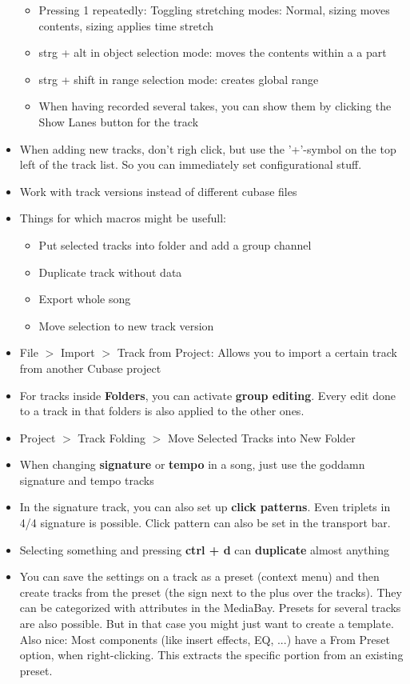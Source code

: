 \documentclass[10pt]{article}
\begin{document}
\begin{itemize}
\begin{itemize}
		\item Pressing 1 repeatedly: Toggling stretching modes: Normal, sizing moves contents, sizing applies time stretch
		\item strg + alt in object selection mode: moves the contents within a a part
		\item strg + shift in range selection mode: creates global range
		\item When having recorded several takes, you can show them by clicking the Show Lanes button for the track
	\end{itemize}
	\item When adding new tracks, don't righ click, but use the '+'-symbol on the top left of the track list. So you can immediately set configurational stuff.
	\item Work with track versions instead of different cubase files
	\item Things for which macros might be usefull:
	\begin{itemize}
		\item Put selected tracks into folder and add a group channel
		\item Duplicate track without data
		\item Export whole song
		\item Move selection to new track version
	\end{itemize}
	\item File $>$ Import $>$ Track from Project: Allows you to import a certain track from another Cubase project
	\item For tracks inside \textbf{Folders}, you can activate \textbf{group editing}. Every edit done to a track in that folders is also applied to the other ones.
	\item Project $>$ Track Folding $>$ Move Selected Tracks into New Folder
	\item When changing \textbf{signature} or \textbf{tempo} in a song, just use the goddamn signature and tempo tracks
	\item In the signature track, you can also set up \textbf{click patterns}. Even triplets in 4/4 signature is possible. Click pattern can also be set in the transport bar.
	\item Selecting something and pressing \textbf{ctrl + d} can \textbf{duplicate} almost anything
	\item You can save the settings on a track as a preset (context menu) and then create tracks from the preset (the sign next to the plus over the tracks). They can be categorized with attributes in the MediaBay. Presets for several tracks are also possible. But in that case you might just want to create a template. Also nice: Most components (like insert effects, EQ, ...) have a From Preset option, when right-clicking. This extracts the specific portion from an existing preset.

\end{itemize}
\end{document}
